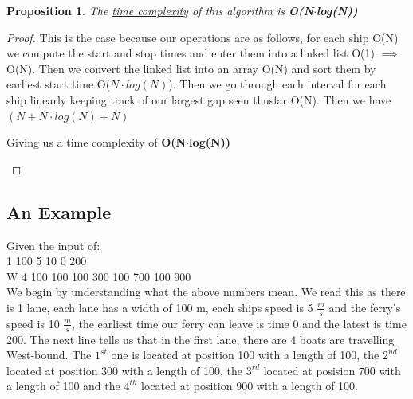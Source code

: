 \documentclass[12pt]{article}
\newtheorem{proposition}[theorem]{Proposition}
\begin{document}
\begin{proposition}
\label{numq}
The \underline{time complexity} of this algorithm is \textbf{O(N$\cdot$log(N))}
\end{proposition}

\begin{proof}
This is the case because our operations are as follows, for each ship O(N) we compute the start
and stop times and enter them into a linked list O(1) $\implies$ O(N). Then we convert the linked
list into an array O(N) and sort them by earliest start time O($N\cdot log(N)$). Then we go through
each interval for each ship linearly keeping track of our largest gap seen thusfar O(N). Then we
have $(N + N\cdot log(N) + N)$


\begin{center}
    Giving us a time complexity of \textbf{O(N$\cdot$log(N))}
\end{center}
\end{proof}

\newpage
\subsection{An Example}
Given the input of: \\
1 100 5 10 0 200 \\
W 4 100 100 100 300 100 700 100 900 \\

We begin by understanding what the above numbers mean. We read this as there is 1 lane, each lane
has a width of 100 m, each ships speed is 5 $\frac{m}{s}$ and the ferry's speed is 10 $\frac{m}{s}$,
the earliest time our ferry can leave is time 0 and the latest is time 200. The next line tells us
that in the first lane, there are 4 boats are travelling West-bound. The $1^{st}$ one is located at
position 100 with a length of 100, the $2^{nd}$ located at position 300 with a length of 100, the
$3^{rd}$ located at posision 700 with a length of 100 and the $4^{th}$ located at position 900 with
a length of 100.
\end{document}

